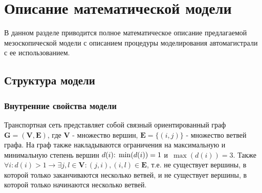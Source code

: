\chapter{Описание математической модели}\label{ch:ch3}

В данном разделе приводится полное математическое описание предлагаемой мезоскопической модели с описанием процедуры моделирования автомагистрали с ее использованием.
\section{Структура модели}
\label{sec:model}
\subsection{Внутренние свойства модели}
\label{sec:graph_structure}
Транспортная сеть представляет собой связный ориентированный граф \(\mathbf{G} = (\mathbf{V}, \mathbf{E})\),
где \(\mathbf{V}\) - множество вершин, \(\mathbf{E} = \{(i, j)\}\) - множество ветвей графа.
На граф также накладываются ограничения на максимальную и минимальную степень вершин \(d(i)$: $\min(d(i)) = 1\) и~\(\max(d(i)) = 3\).
Также \(\forall i: d(i) > 1 \rightarrow \exists j, l \in \mathbf{V} : (j, i), (i, l) \in \mathbf{E}\), т.е. не существует вершины, в которой только заканчиваются несколько ветвей, и не существует вершины, в которой только начинаются несколько ветвей.

